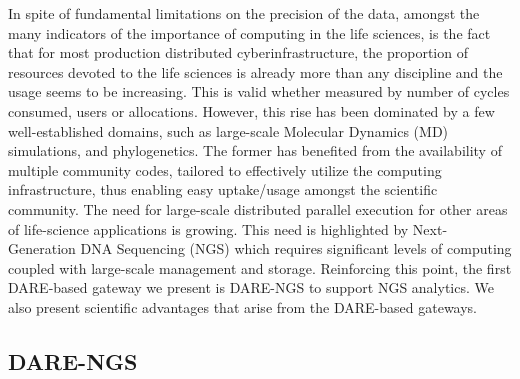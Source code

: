 \documentclass[]{svjour3}
\begin{document}
In spite of fundamental limitations on the precision of the data,
amongst the many indicators of the importance of computing in the life
sciences, is the fact that for most production distributed
cyberinfrastructure, the proportion of resources devoted to the life
sciences is already more than any discipline and the usage seems to be
increasing. This is valid whether measured by number of cycles
consumed, users or allocations.  However, this rise has been dominated
by a few well-established domains, such as large-scale Molecular
Dynamics (MD) simulations, and phylogenetics.  The former has
benefited from the availability of multiple community codes, tailored
to effectively utilize the computing infrastructure, thus enabling
easy uptake/usage amongst the scientific community.  The need for
large-scale distributed parallel execution for other areas of
life-science applications is growing.  This need is highlighted by
Next-Generation DNA Sequencing (NGS) which requires significant levels
of computing coupled with large-scale management and storage.
Reinforcing this point, the first DARE-based gateway we present is
DARE-NGS to support NGS analytics. We also present scientific
advantages that arise from the DARE-based gateways.


\subsection{DARE-NGS}
\end{document}
